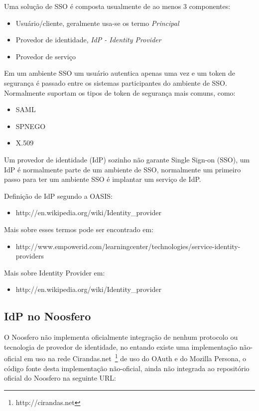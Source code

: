\documentclass[11pt]{article}
\begin{document}
Uma solução de SSO é composta usualmente de ao menos 3 componentes:

\begin{itemize}
  \item{Usuário/cliente, geralmente usa-se os termo {\it Principal}}
  \item{Provedor de identidade, {\it IdP - Identity Provider}}
  \item{Provedor de serviço}
\end{itemize}

Em um ambiente SSO um usuário autentica apenas uma vez e um token de segurança
é passado entre os sistemas participantes do ambiente de SSO. Normalmente
suportam os tipos de token de segurança mais comuns, como:

\begin{itemize}
  \item{SAML}
  \item{SPNEGO}
  \item{X.509}
\end{itemize}

Um provedor de identidade (IdP) sozinho não garante Single Sign-on (SSO), um
IdP é normalmente parte de um ambiente de SSO, normalmente um primeiro passo
para ter um ambiente SSO é implantar um serviço de IdP.

Definição de IdP segundo a OASIS:

\begin{itemize}
  \item{http://en.wikipedia.org/wiki/Identity\_provider}
\end{itemize}

Mais sobre esses termos pode ser encontrado em:
\begin{itemize}
  \item{http://www.empowerid.com/learningcenter/technologies/service-identity-providers}
\end{itemize}

Mais sobre Identity Provider em:
\begin{itemize}
  \item{http://en.wikipedia.org/wiki/Identity\_provider}
\end{itemize}

\subsection{IdP no Noosfero}

O Noosfero não implementa oficialmente integração de nenhum protocolo ou
tecnologia de provedor de identidade, no entando existe uma implementação
não-oficial em uso na rede Cirandas.net~\footnote{http://cirandas.net} de uso
do OAuth e do Mozilla Persona, o código fonte desta implementação não-oficial,
ainda não integrada ao repositório oficial do Noosfero na seguinte URL:
\end{document}
